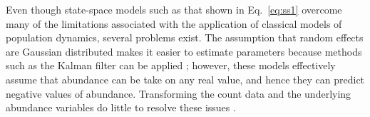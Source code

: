 \documentclass[12pt]{article}
\begin{document}
Even though state-space models such as that shown in Eq.~\ref{eq:ss1}
overcome many of the limitations associated with the application of
classical models of population dynamics, 
several problems exist. %
The assumption that random effects are Gaussian distributed makes it
easier to estimate parameters because methods such as the Kalman
filter can be applied %
\citep{dennis_etal:2006}; however, %
these models effectively assume that abundance can be take on any
real value, and hence they can predict negative values of abundance. %
Transforming the count data and the underlying abundance variables 
do little to resolve these issues \citep{ohara_kotze:2010}.
\end{document}
